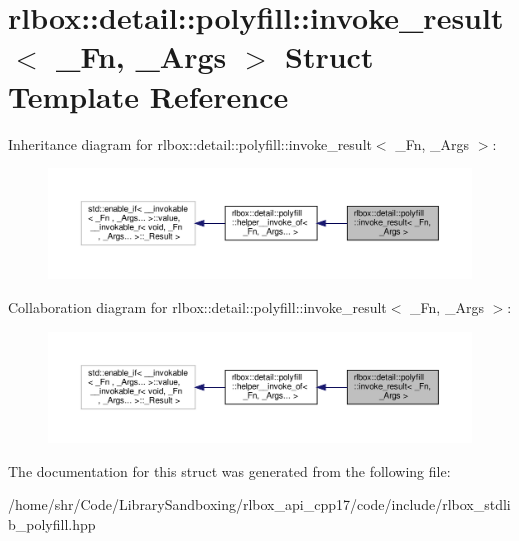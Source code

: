 \hypertarget{structrlbox_1_1detail_1_1polyfill_1_1invoke__result}{}\section{rlbox\+:\+:detail\+:\+:polyfill\+:\+:invoke\+\_\+result$<$ \+\_\+\+Fn, \+\_\+\+Args $>$ Struct Template Reference}
\label{structrlbox_1_1detail_1_1polyfill_1_1invoke__result}


Inheritance diagram for rlbox\+:\+:detail\+:\+:polyfill\+:\+:invoke\+\_\+result$<$ \+\_\+\+Fn, \+\_\+\+Args $>$\+:
\nopagebreak
\begin{figure}[H]
\begin{center}
\leavevmode
\includegraphics[width=350pt]{structrlbox_1_1detail_1_1polyfill_1_1invoke__result__inherit__graph}
\end{center}
\end{figure}


Collaboration diagram for rlbox\+:\+:detail\+:\+:polyfill\+:\+:invoke\+\_\+result$<$ \+\_\+\+Fn, \+\_\+\+Args $>$\+:
\nopagebreak
\begin{figure}[H]
\begin{center}
\leavevmode
\includegraphics[width=350pt]{structrlbox_1_1detail_1_1polyfill_1_1invoke__result__coll__graph}
\end{center}
\end{figure}


The documentation for this struct was generated from the following file\+:\begin{DoxyCompactItemize}
\item 
/home/shr/\+Code/\+Library\+Sandboxing/rlbox\+\_\+api\+\_\+cpp17/code/include/rlbox\+\_\+stdlib\+\_\+polyfill.\+hpp\end{DoxyCompactItemize}
